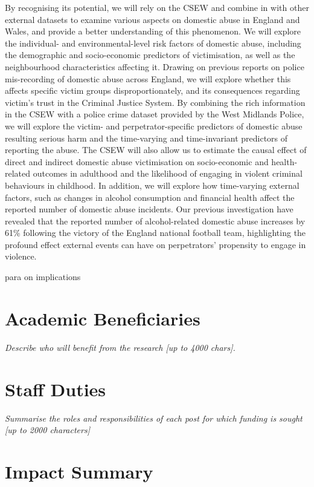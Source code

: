 \documentclass[11pt, a4paper]{article}
\begin{document}
 By recognising its potential, we will rely on the CSEW and combine in with other external datasets to examine various aspects on domestic abuse in England and Wales, and provide a better understanding of this phenomenon. We will explore the individual- and environmental-level risk factors of domestic abuse, including the demographic and socio-economic predictors of victimisation, as well as the neighbourhood characteristics affecting it. Drawing on previous reports on police mis-recording of domestic abuse across England, we will explore whether this affects specific victim groups disproportionately, and its consequences regarding victim's trust in the Criminal Justice System. By combining the rich information in the CSEW with a police crime dataset provided by the West Midlands Police, we will explore the victim- and perpetrator-specific predictors of domestic abuse resulting serious harm and the time-varying and time-invariant predictors of reporting the abuse. The CSEW will also allow us to estimate the causal effect of direct and indirect domestic abuse victimisation on socio-economic and health-related outcomes in adulthood and the likelihood of engaging in violent criminal behaviours in childhood. In addition, we will explore how time-varying external factors, such as changes in alcohol consumption and financial health affect the reported number of domestic abuse incidents. Our previous investigation have revealed that the reported number of alcohol-related domestic abuse increases by 61\% following the victory of the England national football team, highlighting the profound effect external events can have on perpetrators' propensity to engage in violence.

para on implications



\section{Academic Beneficiaries}

\textit{Describe who will benefit from the research [up to 4000 chars].}

\section{Staff Duties}

\textit{Summarise the roles and responsibilities of each post for which funding is sought [up to 2000 characters]}

\section{Impact Summary }
\end{document}
